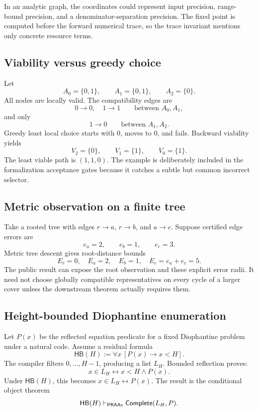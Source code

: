 In an analytic graph, the coordinates could represent input precision, range-bound precision, and a denominator-separation precision.  The fixed point is computed before the forward numerical trace, so the trace invariant mentions only concrete resource terms.

\subsection{Viability versus greedy choice}

Let
\[
A_0=\{0,1\},\qquad A_1=\{0,1\},\qquad A_2=\{0\}.
\]
All nodes are locally valid.  The compatibility edges are
\[
  0\to0,\quad 1\to1
  \qquad\text{between }A_0,A_1,
\]
and only
\[
  1\to0
  \qquad\text{between }A_1,A_2.
\]
Greedy least local choice starts with \(0\), moves to \(0\), and fails.  Backward viability yields
\[
  V_2=\{0\},\qquad V_1=\{1\},\qquad V_0=\{1\}.
\]
The least viable path is \((1,1,0)\).  The example is deliberately included in the formalization acceptance gates because it catches a subtle but common incorrect selector.

\subsection{Metric observation on a finite tree}

Take a rooted tree with edges \(r\to a\), \(r\to b\), and \(a\to c\).  Suppose certified edge errors are
\[
 e_a=2,\qquad e_b=1,\qquad e_c=3.
\]
Metric tree descent gives root-distance bounds
\[
  E_r=0,
  \quad E_a=2,
  \quad E_b=1,
  \quad E_c=e_a+e_c=5.
\]
The public result can expose the root observation and these explicit error radii.  It need not choose globally compatible representatives on every cycle of a larger cover unless the downstream theorem actually requires them.

\subsection{Height-bounded Diophantine enumeration}

Let \(P(x)\) be the reflected equation predicate for a fixed Diophantine problem under a natural code.  Assume a residual formula
\[
  \mathsf{HB}(H):=\forall x\,[P(x)\to x<H].
\]
The compiler filters \(0,\ldots,H-1\), producing a list \(L_H\).  Bounded reflection proves:
\[
  x\in L_H\leftrightarrow x<H\wedge P(x).
\]
Under \(\mathsf{HB}(H)\), this becomes \(x\in L_H\leftrightarrow P(x)\).  The result is the conditional object theorem
\[
  \mathsf{HB}(H)\vdash_{\mathsf{PRAAx}}\mathsf{Complete}(L_H,P).
\]

